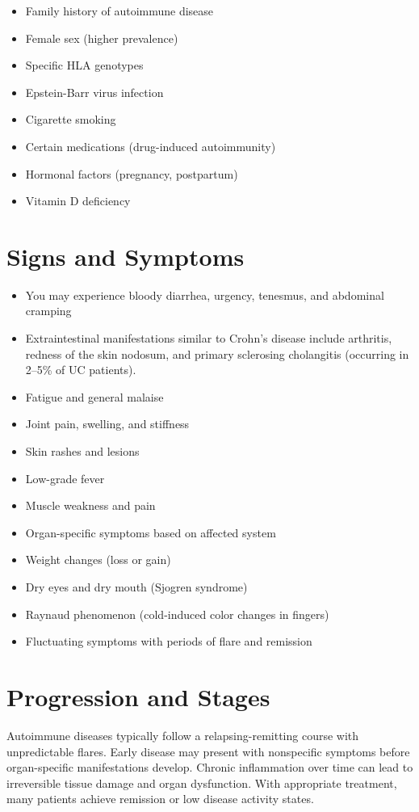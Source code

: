 \begin{itemize}[noitemsep]
  \item Family history of autoimmune disease
  \item Female sex (higher prevalence)
  \item Specific HLA genotypes
  \item Epstein-Barr virus infection
  \item Cigarette smoking
  \item Certain medications (drug-induced autoimmunity)
  \item Hormonal factors (pregnancy, postpartum)
  \item Vitamin D deficiency
\end{itemize}
\section{Signs and Symptoms}
\begin{itemize}[noitemsep]
  \item You may experience bloody diarrhea, urgency, tenesmus, and abdominal cramping
  \item Extraintestinal manifestations similar to Crohn's disease include arthritis, redness of the skin nodosum, and primary sclerosing cholangitis (occurring in 2--5\% of UC patients).
  \item Fatigue and general malaise
  \item Joint pain, swelling, and stiffness
  \item Skin rashes and lesions
  \item Low-grade fever
  \item Muscle weakness and pain
  \item Organ-specific symptoms based on affected system
  \item Weight changes (loss or gain)
  \item Dry eyes and dry mouth (Sjogren syndrome)
  \item Raynaud phenomenon (cold-induced color changes in fingers)
  \item Fluctuating symptoms with periods of flare and remission
\end{itemize}
\section{Progression and Stages}
Autoimmune diseases typically follow a relapsing-remitting course with unpredictable flares. Early disease may present with nonspecific symptoms before organ-specific manifestations develop. Chronic inflammation over time can lead to irreversible tissue damage and organ dysfunction. With appropriate treatment, many patients achieve remission or low disease activity states.

